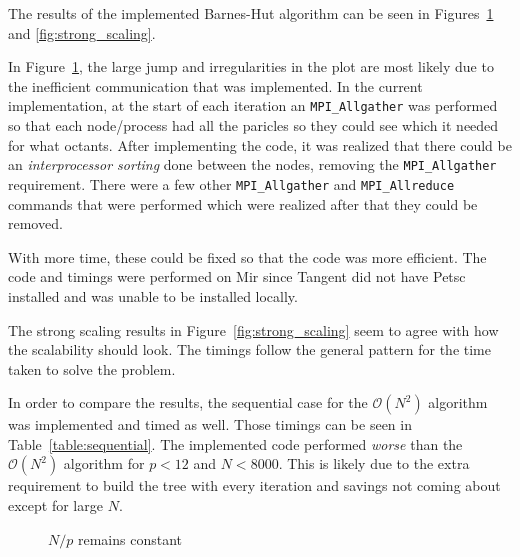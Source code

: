 The results of the implemented Barnes-Hut algorithm can be seen in Figures~\ref{fig:weak_scaling} and \ref{fig:strong_scaling}.

In Figure~\ref{fig:weak_scaling}, the large jump and irregularities in the plot are most likely due to the inefficient communication that was implemented. In the current implementation, at the start of each iteration an {\tt MPI\_Allgather} was performed so that each node/process had all the paricles so they could see which it needed for what octants. After implementing the code, it was realized that there could be an {\em interprocessor sorting} done between the nodes, removing the {\tt MPI\_Allgather} requirement. There were a few other {\tt MPI\_Allgather} and {\tt MPI\_Allreduce} commands that were performed which were realized after that they could be removed.

With more time, these could be fixed so that the code was more efficient. The code and timings were performed on {\sc Mir} since {\sc Tangent} did not have {\sc Petsc} installed and was unable to be installed locally.

The strong scaling results in Figure~\ref{fig:strong_scaling} seem to agree with how the scalability should look. The timings follow the general pattern for the time taken to solve the problem.

In order to compare the results, the sequential case for the $\mathcal{O}\left( N^{2}\right)$ algorithm was implemented and timed as well. Those timings can be seen in Table~\ref{table:sequential}. The implemented code performed {\em worse} than the $\mathcal{O}\left( N^{2}\right)$ algorithm for $p < 12$ and $N < 8000$. This is likely due to the extra requirement to build the tree with every iteration and savings not coming about except for large $N$.



\begin{figure}[H]
\centering
{}
\caption{$N/p$ remains constant}
\label{fig:weak_scaling}
\end{figure}

